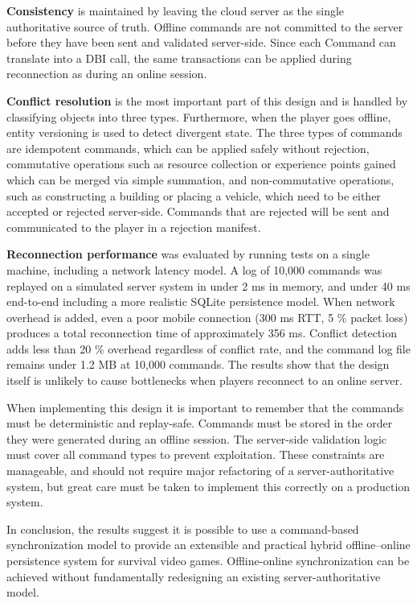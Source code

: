 \documentclass{article}
\begin{document}
\textbf{Consistency} is maintained by leaving the cloud server as the single authoritative source of truth. Offline commands are not committed to the server before they have been sent and validated server-side. Since each Command can translate into a DBI call, the same transactions can be applied during reconnection as during an online session. 

\textbf{Conflict resolution} is the most important part of this design and is handled by classifying objects into three types. Furthermore, when the player goes offline, entity versioning is used to detect divergent state. The three types of commands are idempotent commands, which can be applied safely without rejection, commutative operations such as resource collection or experience points gained which can be merged via simple summation, and non-commutative operations, such as constructing a building or placing a vehicle, which need to be either accepted or rejected server-side. Commands that are rejected will be sent and communicated to the player in a rejection manifest.

\textbf{Reconnection performance} was evaluated by running tests on a single machine, including a network latency model. A log of 10,000 commands was replayed on a simulated server system in under 2 ms in memory, and under 40 ms end-to-end including a more realistic SQLite persistence model. When network overhead is added, even a poor mobile connection (300 ms RTT, 5 \% packet loss) produces a total reconnection time of approximately 356 ms. Conflict detection adds less than 20 \% overhead regardless of conflict rate, and the command log file remains under 1.2 MB at 10,000 commands. The results show that the design itself is unlikely to cause bottlenecks when players reconnect to an online server.

When implementing this design it is important to remember that the commands must be deterministic and replay-safe. Commands must be stored in the order they were generated during an offline session. The server-side validation logic must cover all command types to prevent exploitation. These constraints are manageable, and should not require major refactoring of a server-authoritative system, but great care must be taken to implement this correctly on a production system.

In conclusion, the results suggest it is possible to use a command-based synchronization model to provide an extensible and practical hybrid offline–online persistence system for survival video games. Offline-online synchronization can be achieved without fundamentally redesigning an existing server-authoritative model.

\newpage

\glsaddall
\printglossaries

\newpage

\printbibliography
\end{document}
